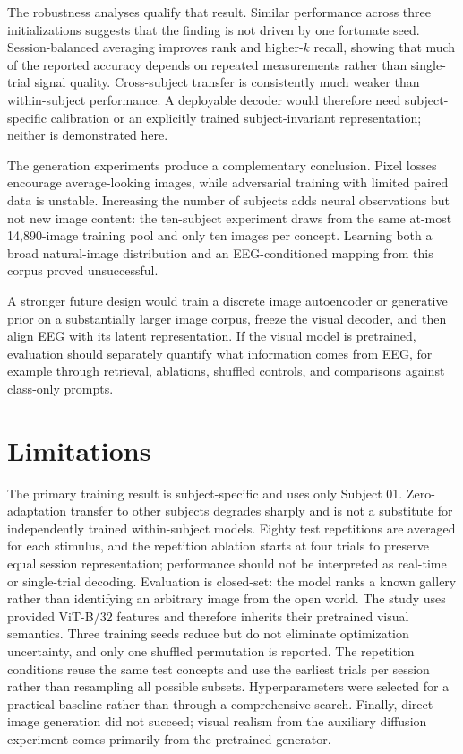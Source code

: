 \documentclass[10pt]{article}
\begin{document}
The robustness analyses qualify that result. Similar performance across three
initializations suggests that the finding is not driven by one fortunate
seed. Session-balanced averaging improves rank and higher-$k$ recall, showing
that much of the reported accuracy depends on repeated measurements rather
than single-trial signal quality. Cross-subject transfer is consistently much
weaker than within-subject performance. A deployable decoder would therefore
need subject-specific calibration or an explicitly trained subject-invariant
representation; neither is demonstrated here.

The generation experiments produce a complementary conclusion. Pixel losses
encourage average-looking images, while adversarial training with limited
paired data is unstable. Increasing the number of subjects adds neural
observations but not new image content: the ten-subject experiment draws from
the same at-most 14,890-image training pool and only ten images per concept.
Learning both a broad natural-image distribution and an EEG-conditioned
mapping from this corpus proved unsuccessful.

A stronger future design would train a discrete image autoencoder or
generative prior on a substantially larger image corpus, freeze the visual
decoder, and then align EEG with its latent representation. If the visual
model is pretrained, evaluation should separately quantify what information
comes from EEG, for example through retrieval, ablations, shuffled controls,
and comparisons against class-only prompts.

\section{Limitations}

The primary training result is subject-specific and uses only Subject 01.
Zero-adaptation transfer to other subjects degrades sharply and is not a
substitute for independently trained within-subject models. Eighty test
repetitions are averaged for each stimulus, and the repetition ablation starts
at four trials to preserve equal session representation; performance should
not be interpreted as real-time or single-trial decoding. Evaluation is closed-set:
the model ranks a known gallery rather than identifying an arbitrary image
from the open world. The study uses provided ViT-B/32 features and therefore
inherits their pretrained visual semantics. Three training seeds reduce but
do not eliminate optimization uncertainty, and only one shuffled permutation
is reported. The repetition conditions reuse the same test concepts and use
the earliest trials per session rather than resampling all possible subsets.
Hyperparameters were selected for a practical baseline rather than through a
comprehensive search. Finally, direct image generation did not succeed;
visual realism from the auxiliary diffusion experiment comes primarily from
the pretrained generator.
\end{document}
